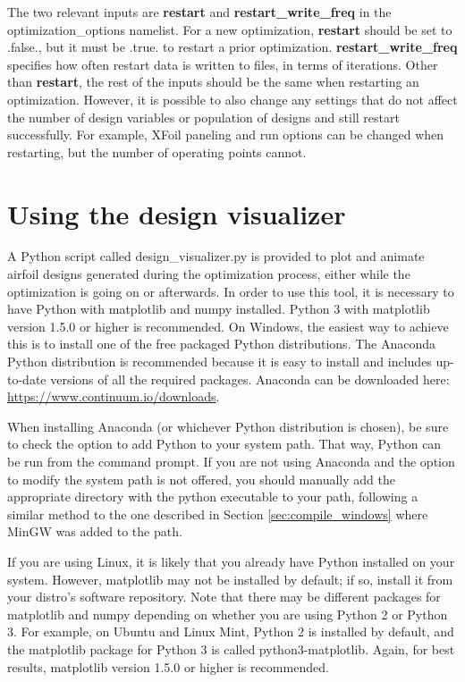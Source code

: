 \documentclass[11pt]{article}
\begin{document}
The two relevant inputs are \textbf{restart} and \textbf{restart\_write\_freq} in the
optimization\_options namelist.  For a new optimization, \textbf{restart} should be set to
.false., but it must be .true. to restart a prior optimization.
\textbf{restart\_write\_freq} specifies how often restart data is written to files, in
terms of iterations.  Other than \textbf{restart}, the rest of the inputs should be the
same when restarting an optimization.  However, it is possible to also change any settings
that do not affect the number of design variables or population of designs and still
restart successfully.  For example, XFoil paneling and run options can be changed when
restarting, but the number of operating points cannot. 

\section{Using the design visualizer}\label{sec:design_visualizer}

A Python script called design\_visualizer.py is provided to plot and animate airfoil
designs generated during the optimization process, either while the optimization is going
on or afterwards.  In order to use this tool, it is
necessary to have Python with matplotlib and numpy installed.  Python 3 with matplotlib
version 1.5.0 or higher is recommended.  On Windows, the easiest
way to achieve this is to install one of the free packaged Python distributions.  The
Anaconda Python distribution is recommended because it is easy to install and includes
up-to-date versions of all the required packages.  Anaconda can be downloaded here:
\url{https://www.continuum.io/downloads}.

When installing Anaconda (or whichever Python distribution is chosen), be sure to check
the option to add Python to your system path.  That way, Python can be run from the
command prompt.  If you are not using Anaconda and the option to modify the system path is
not offered, you should manually add the appropriate directory with the python executable
to your path, following a similar method to the one described in Section
\ref{sec:compile_windows} where MinGW was added to the path.

If you are using Linux, it is likely that you already have Python installed on your
system.  However, matplotlib may not be installed by default; if so, install it from your
distro's software repository.  Note that there may be different packages for matplotlib
and numpy depending on whether you are using Python 2 or Python 3. 
For example, on Ubuntu and Linux Mint, Python 2 is installed by default, and the
matplotlib package for Python 3 is called python3-matplotlib.   Again, for best results,
matplotlib version 1.5.0 or higher is recommended.
\end{document}
